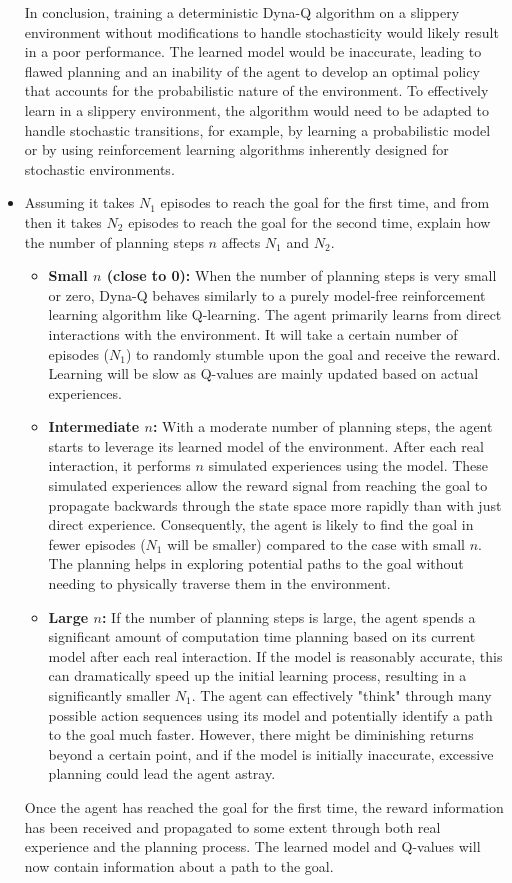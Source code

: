 \begin{itemize}
In conclusion, training a deterministic Dyna-Q algorithm on a slippery environment without modifications to handle stochasticity would likely result in a poor performance. The learned model would be inaccurate, leading to flawed planning and an inability of the agent to develop an optimal policy that accounts for the probabilistic nature of the environment. To effectively learn in a slippery environment, the algorithm would need to be adapted to handle stochastic transitions, for example, by learning a probabilistic model or by using reinforcement learning algorithms inherently designed for stochastic environments.
    \item Assuming it takes $N_1$ episodes to reach the goal for the first time, and from then it takes $N_2$ episodes to reach the goal for the second time, explain how the number of planning steps $n$ affects $N_1$ and $N_2$.
    \begin{itemize}
        \item \textbf{Small $n$ (close to 0):} When the number of planning steps is very small or zero, Dyna-Q behaves similarly to a purely model-free reinforcement learning algorithm like Q-learning. The agent primarily learns from direct interactions with the environment. It will take a certain number of episodes ($N_1$) to randomly stumble upon the goal and receive the reward. Learning will be slow as Q-values are mainly updated based on actual experiences.
        \item \textbf{Intermediate $n$:} With a moderate number of planning steps, the agent starts to leverage its learned model of the environment. After each real interaction, it performs $n$ simulated experiences using the model. These simulated experiences allow the reward signal from reaching the goal to propagate backwards through the state space more rapidly than with just direct experience. Consequently, the agent is likely to find the goal in fewer episodes ($N_1$ will be smaller) compared to the case with small $n$. The planning helps in exploring potential paths to the goal without needing to physically traverse them in the environment.
        \item \textbf{Large $n$:} If the number of planning steps is large, the agent spends a significant amount of computation time planning based on its current model after each real interaction. If the model is reasonably accurate, this can dramatically speed up the initial learning process, resulting in a significantly smaller $N_1$. The agent can effectively "think" through many possible action sequences using its model and potentially identify a path to the goal much faster. However, there might be diminishing returns beyond a certain point, and if the model is initially inaccurate, excessive planning could lead the agent astray.
    \end{itemize}    
    Once the agent has reached the goal for the first time, the reward information has been received and propagated to some extent through both real experience and the planning process. The learned model and Q-values will now contain information about a path to the goal.
    

\end{itemize}
